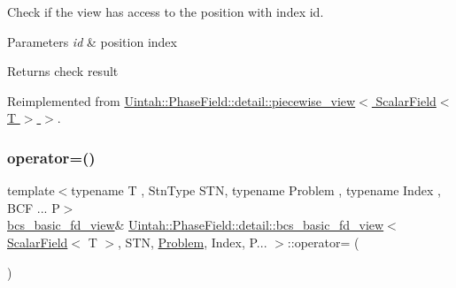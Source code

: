 Check if the view has access to the position with index id. 


\begin{DoxyParams}{Parameters}
{\em id} & position index \\
\hline
\end{DoxyParams}
\begin{DoxyReturn}{Returns}
check result 
\end{DoxyReturn}


Reimplemented from \hyperlink{classUintah_1_1PhaseField_1_1detail_1_1piecewise__view_3_01ScalarField_3_01T_01_4_01_4_a6fd5f9ee9b2e91f114845fa2ada152e0}{Uintah\+::\+Phase\+Field\+::detail\+::piecewise\+\_\+view$<$ Scalar\+Field$<$ T $>$ $>$}.

\mbox{\label{classUintah_1_1PhaseField_1_1detail_1_1bcs__basic__fd__view_3_01ScalarField_3_01T_01_4_00_01STN_07caa9955adf783da0505eac75e76f08_a68f359b2c857a801daf7875ee6e1c3cf}} 
\subsubsection{\texorpdfstring{operator=()}{operator=()}}
{\footnotesize\ttfamily template$<$typename T , Stn\+Type S\+TN, typename Problem , typename Index , B\+C\+F ... P$>$ \\
\hyperlink{classUintah_1_1PhaseField_1_1detail_1_1bcs__basic__fd__view}{bcs\+\_\+basic\+\_\+fd\+\_\+view}\& \hyperlink{classUintah_1_1PhaseField_1_1detail_1_1bcs__basic__fd__view}{Uintah\+::\+Phase\+Field\+::detail\+::bcs\+\_\+basic\+\_\+fd\+\_\+view}$<$ \hyperlink{structUintah_1_1PhaseField_1_1ScalarField}{Scalar\+Field}$<$ T $>$, S\+TN, \hyperlink{classUintah_1_1PhaseField_1_1Problem}{Problem}, Index, P... $>$\+::operator= (\begin{DoxyParamCaption}\item[{const \hyperlink{classUintah_1_1PhaseField_1_1detail_1_1bcs__basic__fd__view}{bcs\+\_\+basic\+\_\+fd\+\_\+view}$<$ \hyperlink{structUintah_1_1PhaseField_1_1ScalarField}{Scalar\+Field}$<$ T $>$, S\+TN, \hyperlink{classUintah_1_1PhaseField_1_1Problem}{Problem}, Index, P... $>$ \&}]{ }\end{DoxyParamCaption})\hspace{0.3cm}{\ttfamily [delete]}}



